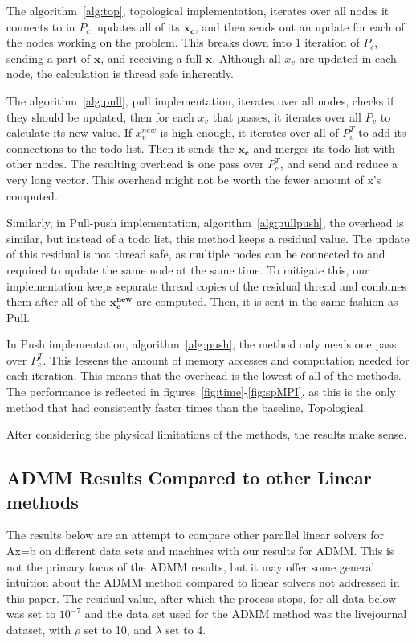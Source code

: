 \documentclass[letterpaper,11pt,onecolumn]{article}
\begin{document}
The algorithm~\ref{alg:top}, topological implementation, iterates over all nodes it connects to in $P_c$, updates all of its $\mathbf{x_c}$, and then sends out an update for each of the nodes working on the problem. This breaks down into 1 iteration of $P_c$, sending a part of $\mathbf{x}$, and receiving a full $\mathbf{x}$. Although all $x_v$ are updated in each node, the calculation is thread safe inherently.

The algorithm~\ref{alg:pull}, pull implementation, iterates over all nodes, checks if they should be updated, then for each $x_v$ that passes, it iterates over all $P_v$ to calculate its new value. If $x_v^{new}$ is high enough, it iterates over all of $P_v^T$ to add its connections to the todo list. Then it sends the $\mathbf{x_c}$ and merges its todo list with other nodes. The resulting overhead is one pass over $P_c^T$, and send and reduce a very long vector. This overhead might not be worth the fewer amount of x's computed.

Similarly, in Pull-push implementation, algorithm~\ref{alg:pullpush}, the overhead is similar, but instead of a todo list, this method keeps a residual value. The update of this residual is not thread safe, as multiple nodes can be connected to and required to update the same node at the same time. To mitigate this, our implementation keeps separate thread copies of the residual thread and combines them after all of the $\mathbf{x_c^{new}}$ are computed. Then, it is sent in the same fashion as Pull.

In Push implementation, algorithm~\ref{alg:push}, the method only needs one pass over $P_c^T$. This lessens the amount of memory accesses and computation needed for each iteration. This means that the overhead is the lowest of all of the methods. The performance is reflected in figures~\ref{fig:time}-\ref{fig:spMPI}, as this is the only method that had consistently faster times than the baseline, Topological.

After considering the physical limitations of the methods, the results make sense. 


\subsection{ADMM Results Compared to other Linear methods}
The results below are an attempt to compare other parallel linear solvers for Ax=b  on different data sets and machines with our results for ADMM. This is not the primary focus of the ADMM results, but it may offer some general intuition about the ADMM method compared to linear solvers not addressed in this paper.
The residual value, after which the process stops, for all data below was set to $10^{-7}$ and the data set used for the ADMM method was the livejournal dataset, with $\rho$ set to 10, and $\lambda$ set to 4.
\end{document}
